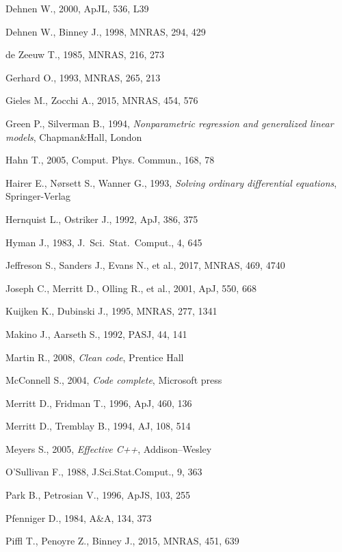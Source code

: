 \documentclass[12pt]{article}
\begin{document}
\begin{thebibliography}{99}
Dehnen W., 2000, ApJL, 536, L39

Dehnen W., Binney J., 1998, MNRAS, 294, 429

de Zeeuw T., 1985, MNRAS, 216, 273

Gerhard O., 1993, MNRAS, 265, 213

Gieles M., Zocchi A., 2015, MNRAS, 454, 576

Green P., Silverman B., 1994, \textsl{Nonparametric regression and generalized linear models}, Chapman\&Hall, London

Hahn T., 2005, Comput. Phys. Commun., 168, 78

Hairer E., N{\o}rsett S., Wanner G., 1993, \textsl{Solving ordinary differential equations}, Springer-Verlag

Hernquist L., Ostriker J., 1992, ApJ, 386, 375

Hyman J., 1983, J.~Sci.~Stat.~Comput., 4, 645

Jeffreson S., Sanders J., Evans N., et al., 2017, MNRAS, 469, 4740

Joseph C., Merritt D., Olling R., et al., 2001, ApJ, 550, 668

Kuijken K., Dubinski J., 1995, MNRAS, 277, 1341

Makino J., Aarseth S., 1992, PASJ, 44, 141

Martin R., 2008, \textsl{Clean code}, Prentice Hall

McConnell S., 2004, \textsl{Code complete}, Microsoft press

Merritt D., Fridman T., 1996, ApJ, 460, 136

Merritt D., Tremblay B., 1994, AJ, 108, 514

Meyers S., 2005, \textsl{Effective C++}, Addison--Wesley

O'Sullivan F., 1988, J.Sci.Stat.Comput., 9, 363

Park B., Petrosian V., 1996, ApJS, 103, 255

Pfenniger D., 1984, A\&A, 134, 373

Piffl T., Penoyre Z., Binney J., 2015, MNRAS, 451, 639


\end{thebibliography}
\end{document}
